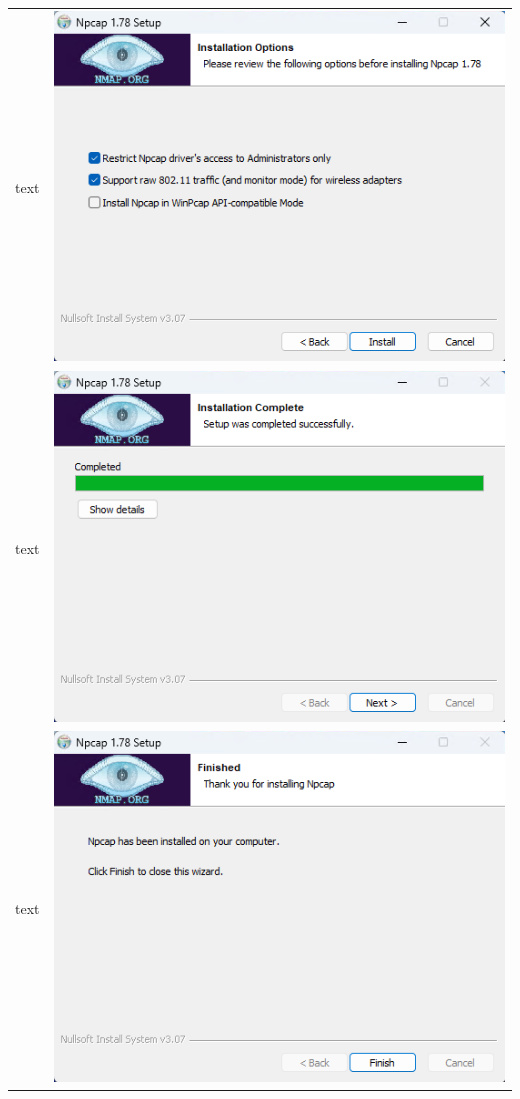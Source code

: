 \documentclass[11pt,a4paper]{report}
\begin{document}
\begin{tabular}{ l r }
            text & \includegraphics[scale=1.0]{wireshark12} \\
            text & \includegraphics[scale=1.0]{wireshark13} \\
            text & \includegraphics[scale=1.0]{wireshark14} \\

\end{tabular}
\end{document}
